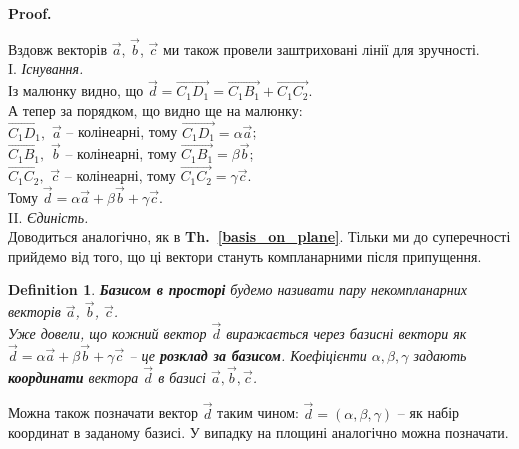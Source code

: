 \documentclass[a4paper, 10pt]{extarticle}
\makeatletter
\def\qed{$\blacksquare$}
\newcommand\thref[1]{\textbf{Th.~\ref{#1}}}
\def\qed{$\blacksquare$}
\theoremstyle{theoremdd}
\theoremstyle{theoremdd}
\newtheorem{definition}[theorem]{Definition}
\theoremstyle{theoremdd}
\theoremstyle{theoremdd}
\theoremstyle{theoremdd}
\theoremstyle{theoremdd}
\theoremstyle{theoremdd}
\theoremstyle{theoremdd}
\renewenvironment{proof}[1][Proof.\\]{\par
\pushQED{\hfill \qed}%
\normalfont \topsep6\p@\@plus6\p@\relax
\trivlist
\item\relax
{\bfseries
#1\@addpunct{.}}\hspace\labelsep\ignorespaces
}{%
\popQED\endtrivlist\@endpefalse
}
\makeatother
\begin{document}
\begin{proof}
\begin{figure}[H]
\end{figure}
	Вздовж векторів $\vec{a}$, $\vec{b}$, $\vec{c}$ ми також провели заштриховані лінії для зручності.\\
	I. \textit{Існування.}\\
	Із малюнку видно, що $\vec{d} = \overrightarrow{C_1D_1} = \overrightarrow{C_1B_1} + \overrightarrow{C_1C_2}$.\\
	А тепер за порядком, що видно ще на малюнку:\\
	$\overrightarrow{C_1D_1},$ $\vec{a}$ -- колінеарні, тому $\overrightarrow{C_1D_1} = \alpha \vec{a}$;\\
	$\overrightarrow{C_1B_1},$ $\vec{b}$ -- колінеарні, тому $\overrightarrow{C_1B_1} = \beta \vec{b}$;\\
	$\overrightarrow{C_1C_2},$ $\vec{c}$ -- колінеарні, тому $\overrightarrow{C_1C_2} = \gamma \vec{c}$.\\
	Тому $\vec{d} = \alpha \vec{a} + \beta \vec{b} + \gamma \vec{c}$.
	\bigskip \\
	II. \textit{Єдиність.} \\
	Доводиться аналогічно, як в \thref{basis_on_plane}. Тільки ми до суперечності прийдемо від того, що ці вектори стануть компланарними після припущення.
\end{proof}

\begin{definition}
\textbf{Базисом в просторі} будемо називати  пару некомпланарних векторів $\vec{a}$, $\vec{b}$, $\vec{c}$.\\
Уже довели, що кожний вектор $\vec{d}$ виражається через базисні вектори як $\vec{d} = \alpha \vec{a} + \beta \vec{b} + \gamma \vec{c}$ -- це \textbf{розклад за базисом}. Коефіцієнти $\alpha,\beta,\gamma$ задають \textbf{координати} вектора $\vec{d}$ в базисі $\vec{a},\vec{b},\vec{c}$.
\end{definition}
\noindent
Можна також позначати вектор $\vec{d}$ таким чином: $\vec{d} = (\alpha, \beta, \gamma)$ -- як набір координат в заданому базисі. У випадку на площині аналогічно можна позначати.
\end{document}
